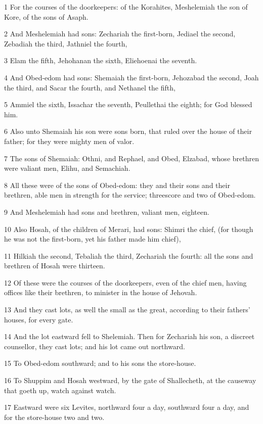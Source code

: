\par 1 For the courses of the doorkeepers: of the Korahites, Meshelemiah the son of Kore, of the sons of Asaph.
\par 2 And Meshelemiah had sons: Zechariah the first-born, Jediael the second, Zebadiah the third, Jathniel the fourth,
\par 3 Elam the fifth, Jehohanan the sixth, Eliehoenai the seventh.
\par 4 And Obed-edom had sons: Shemaiah the first-born, Jehozabad the second, Joah the third, and Sacar the fourth, and Nethanel the fifth,
\par 5 Ammiel the sixth, Issachar the seventh, Peullethai the eighth; for God blessed him.
\par 6 Also unto Shemaiah his son were sons born, that ruled over the house of their father; for they were mighty men of valor.
\par 7 The sons of Shemaiah: Othni, and Rephael, and Obed, Elzabad, whose brethren were valiant men, Elihu, and Semachiah.
\par 8 All these were of the sons of Obed-edom: they and their sons and their brethren, able men in strength for the service; threescore and two of Obed-edom.
\par 9 And Meshelemiah had sons and brethren, valiant men, eighteen.
\par 10 Also Hosah, of the children of Merari, had sons: Shimri the chief, (for though he was not the first-born, yet his father made him chief),
\par 11 Hilkiah the second, Tebaliah the third, Zechariah the fourth: all the sons and brethren of Hosah were thirteen.
\par 12 Of these were the courses of the doorkeepers, even of the chief men, having offices like their brethren, to minister in the house of Jehovah.
\par 13 And they cast lots, as well the small as the great, according to their fathers' houses, for every gate.
\par 14 And the lot eastward fell to Shelemiah. Then for Zechariah his son, a discreet counsellor, they cast lots; and his lot came out northward.
\par 15 To Obed-edom southward; and to his sons the store-house.
\par 16 To Shuppim and Hosah westward, by the gate of Shallecheth, at the causeway that goeth up, watch against watch.
\par 17 Eastward were six Levites, northward four a day, southward four a day, and for the store-house two and two.
